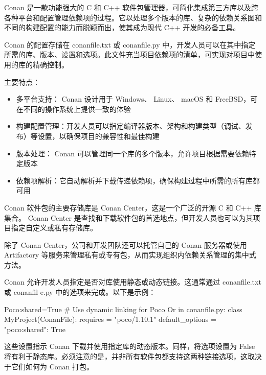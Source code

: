 Conan 是一款功能强大的 C 和 C++ 软件包管理器，可简化集成第三方库以及跨各种平台和配置管理依赖项的过程。它以处理多个版本的库、复杂的依赖关系图和不同的构建配置的能力而脱颖而出，使其成为现代 C++ 开发的必备工具。


Conan 的配置存储在 conanfile.txt 或 conanfile.py 中，开发人员可以在其中指定所需的库、版本、设置和选项。此文件充当项目依赖项的清单，可实现对项目中使用的库的精确控制。

主要特点：

\begin{itemize}
\item
多平台支持： Conan 设计用于 Windows、 Linux、 macOS 和 FreeBSD，可在不同的操作系统上提供一致的体验

\item
构建配置管理：开发人员可以指定编译器版本、架构和构建类型（调试、发布）等设置，以确保项目的兼容性和最佳构建

\item
版本处理： Conan 可以管理同一个库的多个版本，允许项目根据需要依赖特定版本

\item
依赖项解析：它自动解析并下载传递依赖项，确保构建过程中所需的所有库都可用
\end{itemize}


Conan 软件包的主要存储库是 Conan Center，这是一个广泛的开源 C 和 C++ 库集合。 Conan Center 是查找和下载软件包的首选地点，但开发人员也可以为其项目指定自定义或私有存储库。

除了 Conan Center，公司和开发团队还可以托管自己的 Conan 服务器或使用 Artifactory 等服务来管理私有或专有包，从而实现组织内依赖关系管理的集中式方法。


Conan 允许开发人员指定是否对库使用静态或动态链接。这通常通过 conanfile.txt 或 conanfil e.py 中的选项来完成。以下是示例：

\begin{shell}
[options]
Poco:shared=True # Use dynamic linking for Poco
Or in conanfile.py:
class MyProject(ConanFile):
    requires = "poco/1.10.1"
    default_options = {"poco:shared": True}
\end{shell}

这些设置指示 Conan 下载并使用指定库的动态版本。同样，将选项设置为 False 将有利于静态库。必须注意的是，并非所有软件包都支持这两种链接选项，这取决于它们如何为 Conan 打包。

